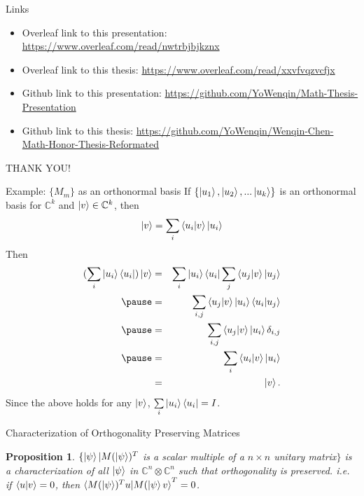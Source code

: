 \documentclass[handout, 10 pt]{beamer}
\newtheorem{prop}{Proposition}
\begin{document}
\begin{frame}{Links}
\begin{itemize}
    \item Overleaf link to this presentation: \href{https://www.overleaf.com/read/nwtrbjbjkznx}{https://www.overleaf.com/read/nwtrbjbjkznx}
    \item Overleaf link to this thesis:
    \href{https://www.overleaf.com/read/xxvfvqzvcfjx}{https://www.overleaf.com/read/xxvfvqzvcfjx}
    \item Github link to this presentation:
    \href{https://github.com/YoWenqin/Math-Thesis-Presentation}{https://github.com/YoWenqin/Math-Thesis-Presentation}
    \item Github link to this thesis:
    \href{https://github.com/YoWenqin/Wenqin-Chen-Math-Honor-Thesis-Reformated}{https://github.com/YoWenqin/Wenqin-Chen-Math-Honor-Thesis-Reformated}
    
\end{itemize}
\end{frame}

\begin{frame}


\begin{center}
\huge{THANK YOU!}

\end{center}

\end{frame}



\begin{frame}{Example: $\{M_m\}$ as an orthonormal basis }
 If $\{\ket{u_1}, \ket{u_2}, ...\ket{u_k}\}$ is an orthonormal basis for ${\mathbb{C}}^k$ and $\ket{v} \in {\mathbb{C}}^k$, then
$$\ket{v}=\sum\limits_i\braket{u_i|v}\ket{u_i}$$
\pause
Then
\begin{eqnarray*}
    (\sum_i \ket{u_i}\bra{u_i})\ket{v}&=&
    \sum_i \ket{u_i}\bra{u_i}\sum_j \braket{u_j|v} \ket{u_j}\\
    \pause
    &=& \sum_{i,j}\braket{u_j|v}\ket{u_i}\braket{u_i|u_j}\\
    \pause
    &=& \sum_{i,j}\braket{u_j|v}\ket{u_i}\delta_{i,j}\\
    \pause
    &=&\sum_i \braket{u_i|v}\ket{u_i}\\
    &=&\ket{v}.
\end{eqnarray*}
\pause
Since the above holds for any $\ket{v}$, $\sum\limits_i \ket{u_i}\bra{u_i}=I$.   
\end{frame}

\begin{frame}{Characterization of Orthogonality Preserving Matrices}
\begin{prop} \label{orthogonality preserving character}
$\{\ket{\psi}|M(\ket{\psi})^T$ is a scalar multiple of a $n \times n$ unitary matrix$\}$ is a characterization of all $\ket{\psi}$ in $\mathbb{C}^n \otimes \mathbb{C}^n$ such that orthogonality is preserved. i.e. if $\braket{u|v}=0$, then $\braket{M(\ket{\psi})^Tu|M(\ket{\psi}v}^T=0$.
\end{prop}

\end{frame}

\end{document}
